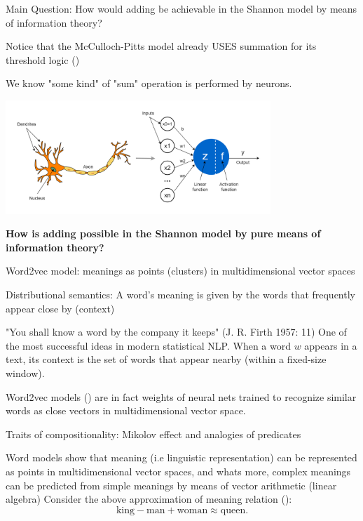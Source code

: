 \documentclass[10pt, aspectratio=169]{beamer}
\begin{document}
\begin{frame}{Main Question: How would adding be achievable in the Shannon model by means of information theory?}


    Notice that the McCulloch-Pitts  model already USES summation for its threshold logic (\cite{mcculloch_logical_1943})
   
     We know "some kind" of "sum" operation is performed by neurons.
     
     \includegraphics[width=10cm]{images/latexImage_63d4c13d6261c28a5b1ff9f3f41e4f0d.png}

  \textbf{ How is adding possible in the Shannon model by pure means of information theory?}
    
\end{frame}
 




\begin{frame}{Word2vec model: meanings as points (clusters) in multidimensional vector spaces}
    

    Distributional semantics: A word's meaning is given by the words that frequently appear close by (context)

    "You shall know a word by the company it keeps" (J. R. Firth 1957: 11)
    One of the most successful ideas in modern statistical NLP.
    When a word $w$ appears in a text, its context is the set of words that appear nearby (within a fixed-size window).

    Word2vec models (\cite{mikolov2013a}) are in fact weights of neural nets trained to recognize similar words as close vectors in multidimensional vector space.


\end{frame}

\begin{frame}{Traits of compositionality:  Mikolov effect and  analogies of predicates}

   Word models show that meaning (i.e linguistic representation) can be represented as points in multidimensional vector spaces, and whats more, complex meanings can be predicted from simple meanings by means of vector arithmetic (linear algebra)
    Consider the above approximation of meaning relation (\cite{mikolov2013a}):
   \huge $$\text{king} - \text{man} + \text{woman} \approx \text{queen}.$$

\end{frame}
\end{document}
